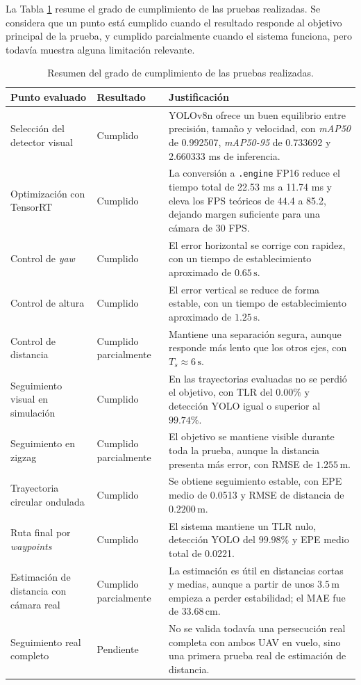 La Tabla \ref{tab:analisis-cumplimiento-resultados} resume el grado de cumplimiento de las pruebas realizadas. Se considera que un punto está cumplido cuando el resultado responde al objetivo principal de la prueba, y cumplido parcialmente cuando el sistema funciona, pero todavía muestra alguna limitación relevante.

\begin{table}[H]
\centering
\caption{Resumen del grado de cumplimiento de las pruebas realizadas.}
\label{tab:analisis-cumplimiento-resultados}
\scriptsize
\setlength{\tabcolsep}{3pt}
\begin{tabular}{p{}p{}p{}}
\hline
\textbf{Punto evaluado} & \textbf{Resultado} & \textbf{Justificación} \\
\hline
Selección del detector visual & Cumplido & YOLOv8n ofrece un buen equilibrio entre precisión, tamaño y velocidad, con \textit{mAP50} de 0.992507, \textit{mAP50-95} de 0.733692 y 2.660333 ms de inferencia. \\
Optimización con TensorRT & Cumplido & La conversión a \texttt{.engine} FP16 reduce el tiempo total de 22.53 ms a 11.74 ms y eleva los FPS teóricos de 44.4 a 85.2, dejando margen suficiente para una cámara de 30 FPS. \\
Control de \textit{yaw} & Cumplido & El error horizontal se corrige con rapidez, con un tiempo de establecimiento aproximado de $0.65\,\mathrm{s}$. \\
Control de altura & Cumplido & El error vertical se reduce de forma estable, con un tiempo de establecimiento aproximado de $1.25\,\mathrm{s}$. \\
Control de distancia & Cumplido parcialmente & Mantiene una separación segura, aunque responde más lento que los otros ejes, con $T_s \approx 6\,\mathrm{s}$. \\
Seguimiento visual en simulación & Cumplido & En las trayectorias evaluadas no se perdió el objetivo, con TLR del $0.00\%$ y detección YOLO igual o superior al $99.74\%$. \\
Seguimiento en zigzag & Cumplido parcialmente & El objetivo se mantiene visible durante toda la prueba, aunque la distancia presenta más error, con RMSE de $1.255\,\mathrm{m}$. \\
Trayectoria circular ondulada & Cumplido & Se obtiene seguimiento estable, con EPE medio de 0.0513 y RMSE de distancia de $0.2200\,\mathrm{m}$. \\
Ruta final por \textit{waypoints} & Cumplido & El sistema mantiene un TLR nulo, detección YOLO del $99.98\%$ y EPE medio total de 0.0221. \\
Estimación de distancia con cámara real & Cumplido parcialmente & La estimación es útil en distancias cortas y medias, aunque a partir de unos $3.5\,\mathrm{m}$ empieza a perder estabilidad; el MAE fue de $33.68\,\mathrm{cm}$. \\
Seguimiento real completo & Pendiente & No se valida todavía una persecución real completa con ambos UAV en vuelo, sino una primera prueba real de estimación de distancia. \\
\hline
\end{tabular}
\end{table}

